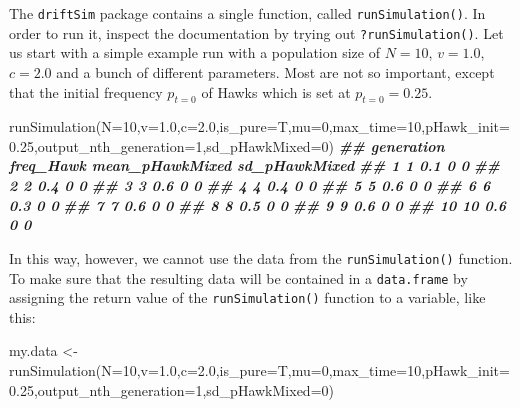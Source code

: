 \documentclass[
]{book}
\newenvironment{Shaded}{\begin{snugshade}}{\end{snugshade}}
\newcommand{\AttributeTok}[1]{\textcolor[rgb]{0.77,0.63,0.00}{#1}}
\newcommand{\DecValTok}[1]{\textcolor[rgb]{0.00,0.00,0.81}{#1}}
\newcommand{\DocumentationTok}[1]{\textcolor[rgb]{0.56,0.35,0.01}{\textbf{\textit{#1}}}}
\newcommand{\FloatTok}[1]{\textcolor[rgb]{0.00,0.00,0.81}{#1}}
\newcommand{\FunctionTok}[1]{\textcolor[rgb]{0.00,0.00,0.00}{#1}}
\newcommand{\NormalTok}[1]{#1}
\newcommand{\OtherTok}[1]{\textcolor[rgb]{0.56,0.35,0.01}{#1}}
\begin{document}
The \texttt{driftSim} package contains a single function, called \texttt{runSimulation()}. In order to run it, inspect the documentation by trying out \texttt{?runSimulation()}. Let us start with a simple example run with a population size of \(N=10\), \(v=1.0\), \(c=2.0\) and a bunch of different parameters. Most are not so important, except that the initial frequency \(p_{t=0}\) of Hawks which is set at \(p_{t=0} = 0.25\).

\begin{Shaded}
\begin{Highlighting}[]
\FunctionTok{runSimulation}\NormalTok{(}\AttributeTok{N=}\DecValTok{10}\NormalTok{,}\AttributeTok{v=}\FloatTok{1.0}\NormalTok{,}\AttributeTok{c=}\FloatTok{2.0}\NormalTok{,}\AttributeTok{is\_pure=}\NormalTok{T,}\AttributeTok{mu=}\DecValTok{0}\NormalTok{,}\AttributeTok{max\_time=}\DecValTok{10}\NormalTok{,}\AttributeTok{pHawk\_init=}\FloatTok{0.25}\NormalTok{,}\AttributeTok{output\_nth\_generation=}\DecValTok{1}\NormalTok{,}\AttributeTok{sd\_pHawkMixed=}\DecValTok{0}\NormalTok{)}
\DocumentationTok{\#\#    generation freq\_Hawk mean\_pHawkMixed sd\_pHawkMixed}
\DocumentationTok{\#\# 1           1       0.1               0             0}
\DocumentationTok{\#\# 2           2       0.4               0             0}
\DocumentationTok{\#\# 3           3       0.6               0             0}
\DocumentationTok{\#\# 4           4       0.4               0             0}
\DocumentationTok{\#\# 5           5       0.6               0             0}
\DocumentationTok{\#\# 6           6       0.3               0             0}
\DocumentationTok{\#\# 7           7       0.6               0             0}
\DocumentationTok{\#\# 8           8       0.5               0             0}
\DocumentationTok{\#\# 9           9       0.6               0             0}
\DocumentationTok{\#\# 10         10       0.6               0             0}
\end{Highlighting}
\end{Shaded}

In this way, however, we cannot use the data from the \texttt{runSimulation()} function. To make sure that the resulting data will be contained in a \texttt{data.frame} by assigning the return value of the \texttt{runSimulation()} function to a variable, like this:

\begin{Shaded}
\begin{Highlighting}[]
\NormalTok{my.data }\OtherTok{\textless{}{-}} \FunctionTok{runSimulation}\NormalTok{(}\AttributeTok{N=}\DecValTok{10}\NormalTok{,}\AttributeTok{v=}\FloatTok{1.0}\NormalTok{,}\AttributeTok{c=}\FloatTok{2.0}\NormalTok{,}\AttributeTok{is\_pure=}\NormalTok{T,}\AttributeTok{mu=}\DecValTok{0}\NormalTok{,}\AttributeTok{max\_time=}\DecValTok{10}\NormalTok{,}\AttributeTok{pHawk\_init=}\FloatTok{0.25}\NormalTok{,}\AttributeTok{output\_nth\_generation=}\DecValTok{1}\NormalTok{,}\AttributeTok{sd\_pHawkMixed=}\DecValTok{0}\NormalTok{)}
\end{Highlighting}
\end{Shaded}
\end{document}
